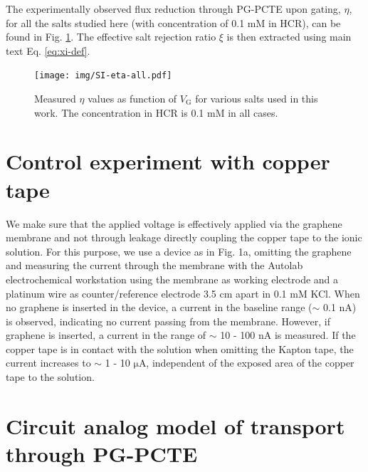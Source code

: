 \documentclass[journal=langd5,email=true, hyperref=true, keywords=false]{achemso}
\newcommand{\Fig}{Fig.}
\begin{document}
The experimentally observed flux reduction through PG-PCTE upon
gating, $\eta$, for all the salts studied here (with concentration of
0.1 mM in HCR), can be found in Fig. \ref{fig:eta-all}. The effective salt
rejection ratio $\xi$ is then extracted using main text
Eq. \ref{eq:xi-def}.

\begin{figure}[htbp]
  \centering
  \texttt{[image: img/SI-eta-all.pdf]}
  \caption{Measured $\eta$ values as function of $V_{\mathrm{G}}$ for
    various salts used in this work. The concentration in HCR is 0.1
    mM in all cases.}
  \label{fig:eta-all}
\end{figure}


\section{Control experiment with copper tape}
\label{sec:copper}
We make sure that the applied voltage is effectively applied via the
graphene membrane and not through leakage directly coupling the
copper tape to the ionic solution. For this purpose, we use a device as in \Fig
1a, omitting the graphene and measuring the current through the
membrane with the Autolab electrochemical workstation using the
membrane as working electrode and a platinum wire as counter/reference
electrode 3.5 cm apart in 0.1 mM KCl. When no graphene is inserted in
the device, a current in the baseline range ($\sim$ 0.1 nA) is
observed, indicating no current passing from the membrane. However, if
graphene is inserted, a current in the range of $\sim$ 10 - 100 nA is
measured. If the copper tape is in contact with the solution when
omitting the Kapton tape, the current increases to $\sim$ 1 - 10
$\mathrm{\mu}$A, independent of the exposed area of the copper tape to
the solution.


\section{Circuit analog model of transport through PG-PCTE}
\label{sec:R-model}
\end{document}
